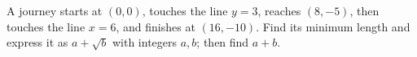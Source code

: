 A journey starts at $(0,0)$, touches the line $y=3$, reaches $(8,-5)$, then touches the line $x=6$, and finishes at $(16,-10)$. Find its minimum length and express it as $a+\sqrt b$ with integers $a,b$; then find $a+b$.
